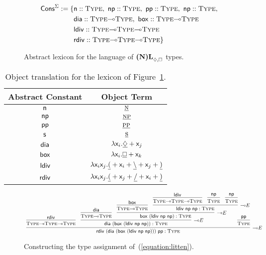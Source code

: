 \begin{figure}
	\begin{align*}
	\cons^{\Sigma} := \{ 
		& 	\smallterm{n} :: \type[s],\ \smallterm{np} :: \type[s],\ \smallterm{pp} :: \type[s],\ \smallterm{np} :: \type[s],\\
		&	\smallterm{dia} :: \type[s]\li\type[s],\ \smallterm{box} :: \type[s]\li\type[s]\\
		&	\smallterm{ldiv} :: \type[s]\li\type[s]\li\type[s] \\
		&	\smallterm{rdiv} :: \type[s]\li\type[s]\li\type[s] \}
	\end{align*}
	\caption{Abstract lexicon for the language of $\logic{(N)L}_{\diamond, \bx}$ types.}
	\label{figure:acg_nl_abstract_lex}
\end{figure}

\begin{table}
	\centering
	\begin{tabular}{@{}cc@{}}
		Abstract Constant							& Object Term\\
		\toprule
		$\mathsf{n}$								& $\underline{\normalfont\textsc{n}}$\\
		$\mathsf{np}$								& $\underline{\normalfont\textsc{np}}$\\
		$\mathsf{pp}$								& $\underline{\normalfont\textsc{pp}}$\\
		$\mathsf{s}$								& $\underline{\normalfont\textsc{s}}$\\
		$\mathsf{dia}$							& $\smallterm{\lam  \vari.\underline{\diamond} + \varj}$\\		
		$\mathsf{box}$							& $\smallterm{\lam  \vari.\underline{\bx} + \vark}$\\		
		$\mathsf{ldiv}$							& $\mathsf{\mathnormal{\lambda}  \mathsf{x}_{\mathnormal{i}}\mathsf{x}_{\mathnormal{j}}.\underline{(} + \mathsf{x}_{\mathnormal{i}} + \underline{\backslash} + \mathsf{x}_{\mathnormal{j}} + \underline{)}}$\\
		$\mathsf{rdiv}$							& $\mathsf{\mathnormal{\lambda}  \mathsf{x}_{\mathnormal{i}}\mathsf{x}_{\mathnormal{j}}.\underline{(} + \mathsf{x}_{\mathnormal{j}} + \underline{/} + \mathsf{x}_{\mathnormal{i}} + \underline{)}}$
	\end{tabular}
	\caption{Object translation for the lexicon of Figure~\ref{figure:acg_nl_abstract_lex}.}
	\label{table:nl_tg_acg}
\end{table}

\begin{figure}
	\[
	\resizebox{1\textwidth}{!}
	{
		\infer[\li E]{\term{rdiv~(dia~(box~(ldiv~np~np)))~pp}:\type}{
			\infer{\type\li\type\li\type}{\term{rdiv}}
			&
			\infer[\li E]{\term{dia~(box~(ldiv~np~np))}: \type}{
				\infer{\type\li\type}{\term{dia}}
				&
				\infer[\li E]{\term{box~(ldiv~np~np)}: \type}{
					\infer{\type\li \type}{\term{box}}
					&
					\infer[\li E]{\term{ldiv~np~np}: \type}{
						\infer{\type \li \type \li \type}{\term{ldiv}}
						&
						\infer{\type}{\term{np}}
						&
						\infer{\type}{\term{np}}
					}					
				}
			}
			&
			\hspace{-35pt}
			\infer{\type}{\term{pp}}
		}
	}
	\]
	\caption{Constructing the type assignment of~(\ref{equation:litten}).}
	\label{figure:litten_acg_der}
\end{figure}

